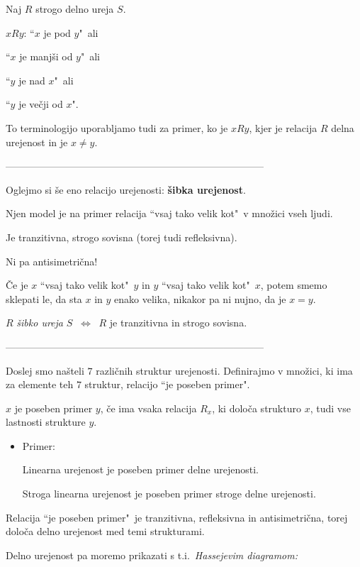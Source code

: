 \documentclass[11pt,paper=b5,footinclude,headinclude]{scrbook} %
\def\cee {{~\Leftrightarrow~}}
\begin{document}
\bigskip

Naj $R$ strogo delno ureja $S$.

$xRy$: ``$x$ je pod  $y$"~ali

``$x$ je manjši od $y$"~ali

``$y$ je nad $x$"~ali

``$y$ je večji od  $x$".


\medskip
To terminologijo uporabljamo tudi za primer, ko je $xRy$, kjer je relacija $R$ delna urejenost in je $x\neq y$.

------------------------------------------------------------------------------

\bigskip

Oglejmo si še eno relacijo urejenosti: \textbf{ šibka urejenost}.

Njen model je na primer relacija ``vsaj tako velik kot"~v množici vseh ljudi.

Je tranzitivna, strogo sovisna (torej tudi refleksivna).

Ni pa antisimetrična!

Če je $x$ ``vsaj tako velik kot"~$y$ in $y$ ``vsaj tako velik kot"~$x$,
potem smemo sklepati le, da sta $x$ in $y$ enako velika, nikakor pa ni nujno, da je $x = y$.

$R$ {\em šibko ureja} $S$ $\cee$ $R$ je tranzitivna in strogo sovisna.

\bigskip

------------------------------------------------------------------------------
\bigskip

Doslej smo našteli $7$ različnih struktur urejenosti.
Definirajmo v množici, ki ima za elemente teh $7$ struktur, relacijo ``je poseben primer".

$x$ je poseben primer $y$, če ima vsaka relacija $R_x$, ki določa strukturo $x$, tudi vse lastnosti strukture $y$.

\begin{itemize}
  \item Primer:

  Linearna urejenost je poseben primer delne urejenosti.

Stroga linearna urejenost je poseben primer stroge delne urejenosti.
\end{itemize}

Relacija ``je poseben primer"~je tranzitivna, refleksivna in antisimetrična, torej določa delno urejenost med temi strukturami.

\newpage
Delno urejenost pa moremo prikazati s t.i.~{\em Hassejevim diagramom:}
\end{document}
